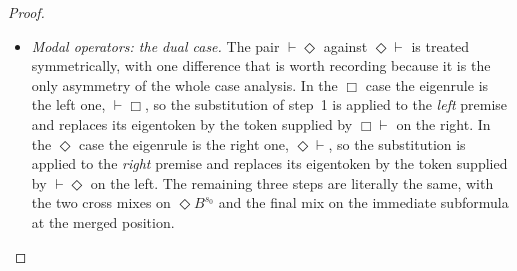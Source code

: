 \documentclass{article}
\newcommand{\seq}[2]{{#1} \vdash{} {#2}}
\newcommand{\pf}[2]{{#1}^{#2}} %
\newcommand{\cana}[1]{#1\!-\!\pf{A}{s}}
\theoremstyle{definition}
\begin{document}
\begin{proof}
\begin{enumerate}
\begin{itemize}
\begin{enumerate}
                    \item Apply the Mix Lemma (by IH, height decrease at the same degree $n$) to $\langle \Pi_p[x/t], \Pi' \rangle$ (cutting $\pf{\Box B}{s_0}$). This yields a proof $\Pi_X$ of $\seq{\Gamma_p, \cana{\Gamma'}}{\pf{B}{s_0,t}, \cana{\Delta_p}, \Delta'}$.
                    \item Apply the Mix Lemma (by IH, height decrease at the same degree $n$) to $\langle \Pi, \Pi'_p \rangle$ (cutting $\pf{\Box B}{s_0}$). This yields a proof $\Pi_Y$ of $\seq{\Gamma, \cana{(\Gamma'_p, \pf{B}{s_0,t})}}{\cana{\Delta}, \Delta'_p}$.
                    \item Apply the Mix Lemma (by IH, degree decrease) to $\langle \Pi_X, \Pi_Y \rangle$ cutting $\pf{B}{s_0,t}$, which has degree $n-1 < n$. The resulting proof, after potential contractions, proves $\seq{\Gamma, \cana{\Gamma'}}{\cana{\Delta}, \Delta'}$.
                \end{enumerate}
                The lexicographic measure decreases in each recursive call: steps 2 and 3 keep the same degree $n$ but strictly decrease the height sum, while step 4 strictly decreases the degree. The overall rank of the resulting proof $\Pi_{mix}$ remains $\le n$.

            \item \textit{Modal operators: the dual case.} The pair $\vdash\!\Diamond$ against $\Diamond\!\vdash$ is treated symmetrically, with one difference that is worth recording because it is the only asymmetry of the whole case analysis. In the $\Box$ case the eigenrule is the left one, $\vdash\!\Box$, so the substitution of step~1 is applied to the \emph{left} premise and replaces its eigentoken by the token supplied by $\Box\!\vdash$ on the right. In the $\Diamond$ case the eigenrule is the right one, $\Diamond\!\vdash$, so the substitution is applied to the \emph{right} premise and replaces its eigentoken by the token supplied by $\vdash\!\Diamond$ on the left. The remaining three steps are literally the same, with the two cross mixes on $\pf{\Diamond B}{s_0}$ and the final mix on the immediate subformula at the merged position.


\end{itemize}
\end{enumerate}
\end{proof}
\end{document}
